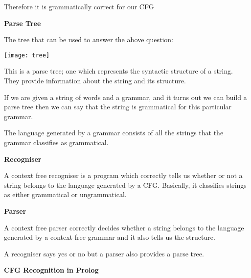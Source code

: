 \documentclass{article}
\begin{document}
Therefore it is grammatically correct for our CFG


\textbf{Parse Tree}

The tree that can be used to answer the above question:

\texttt{[image: tree]}

This is a parse tree; one which represents the syntactic structure of a string. They provide information about the string and its structure.

If we are given a string of words and a grammar, and it turns out we can build a parse tree then we can say that the string is grammatical for this particular grammar.

The language generated by a grammar consists of all the strings that the grammar classifies as grammatical.


\textbf{Recogniser}

A context free recogniser is a program which correctly tells us whether or not a string belongs to the language generated by a CFG. Basically, it classifies strings as either grammatical or ungrammatical.


\textbf{Parser}

A context free parser correctly decides whether a string belongs to the language generated by a context free grammar and it also tells us the structure.


A recogniser says yes or no but a parser also provides a parse tree.



\textbf{CFG Recognition in Prolog}
\end{document}

